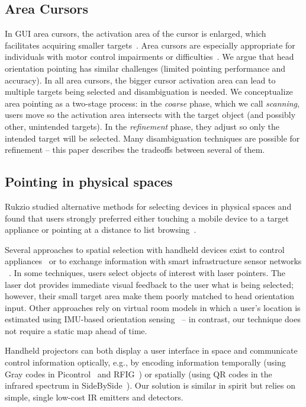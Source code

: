 \subsection{Area Cursors}
In GUI area cursors, the activation area of the cursor is enlarged, which facilitates acquiring smaller targets~\cite{kabbash1995prince}. Area cursors are especially appropriate for individuals with motor control impairments or difficulties~\cite{worden1997making,findlater2010enhanced}. We argue that head orientation pointing has similar challenges (limited pointing performance and accuracy). In all area cursors, the bigger cursor activation area can lead to multiple targets being selected and disambiguation is needed. 
We conceptualize area pointing as a two-stage process: in the {\em coarse} phase, which we call {\em scanning}, users move so the activation area intersects with the target object (and possibly other, unintended targets). In the {\em refinement} phase, they adjust so only the intended target will be selected. Many disambiguation techniques are possible for refinement -- this paper describes the tradeoffs between several of them.

\subsection{Pointing in physical spaces}
Rukzio studied alternative methods for selecting devices in physical spaces and found that users strongly preferred either touching a mobile device to a target appliance or pointing at a distance to list browsing~\cite{rukzio_experimental_2006}.

Several approaches to spatial selection with handheld devices exist to control appliances~\cite{beigl_point_1999,patel_2-way_2003,wilson_xwand:_2003,schmidt_picontrol:_2012,kemp_point-and-click_2008} or to exchange information with smart infrastructure sensor networks ~\cite{lifton_tricorder:_2007,mittal_ubicorder:_2011,costanza_sensortune:_2010}. In some techniques, users select objects of interest with laser pointers. The laser dot provides immediate visual feedback to the user what is being selected; however, their small target area make them poorly matched to head orientation input.
Other approaches rely on virtual room models in which a user's location is estimated using IMU-based orientation sensing~\cite{wilson_xwand:_2003,lifton_tricorder:_2007} -- in contrast, our technique does not require a static map ahead of time.

Handheld projectors can both display a user interface in space and communicate control information optically, e.g., by encoding information temporally (using Gray codes in Picontrol~\cite{schmidt_picontrol:_2012} and RFIG~\cite{raskar_rfig_2004}) or spatially (using QR codes in the infrared spectrum in SideBySide~\cite{willis_sidebyside:_2011}). Our solution is similar in spirit but relies on simple, single low-cost IR emitters and detectors. 

